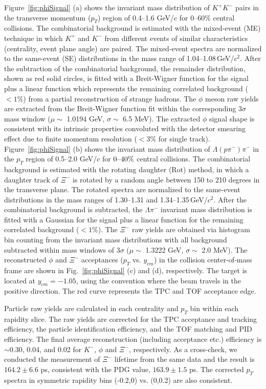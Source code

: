 \documentclass[aps,tightenlines,superscriptaddress,twocolumn]{revtex4-1}
\begin{document}
Figure~\ref{fig:phiSignal} (a) shows the invariant mass distribution of $K^+K^-$ pairs in the transverse momentum ($p_{T}$) region of 0.4--1.6 GeV/$c$ for 0--60\% central collisions. The combinatorial background is estimated with the mixed-event (ME) technique in which $K^+$ and $K^-$ from different events of similar characteristics (centrality, event plane angle) are paired. The mixed-event spectra are normalized to the same-event (SE) distributions in the mass range of 1.04--1.08\,GeV/$c^2$. After the subtraction of the combinatorial background, the remainder distribution, shown as red solid circles, 
is fitted with a Breit-Wigner function for the signal plus a linear function which represents the remaining correlated background ($< 1\%$) from a partial reconstruction of strange hadrons. The $\phi$ meson raw yields are extracted from the Breit-Wigner function fit within the corresponding 3$\sigma$ mass window ($\mu\sim$ 1.0194 GeV, $\sigma\sim$ 6.5 MeV). The extracted $\phi$ signal shape is consistent with its intrinsic properties convoluted with the detector smearing effect due to finite momentum resolution ($<3\%$ for single track).
Figure~\ref{fig:phiSignal} (b) shows the invariant mass distribution of $\Lambda(p\pi^-)\pi^-$ in the $p_{T}$ region of 0.5--2.0 GeV/$c$ for $\textup{0--40\%}$ central collisions. The combinatorial background is estimated with the rotating daughter (Rot) method, in which a daughter track of $\Xi^-$ is rotated by a random angle between 150 to 210 degrees in the transverse plane. The rotated spectra are normalized to the same-event distributions in the mass ranges of 1.30--1.31 and 1.34--1.35\,GeV/$c^2$. After the combinatorial background is subtracted, the $\Lambda\pi^-$ invariant mass distribution is fitted with a Gaussian for the signal plus a linear function for the remaining correlated background ($< 1\%$). The $\Xi^-$ raw yields are obtained via histogram bin counting from the invariant mass distributions with all background subtracted within mass windows of 3$\sigma$ ($\mu\sim$ 1.3222 GeV, $\sigma\sim$ 2.0 MeV). The reconstructed $\phi$ and $\Xi^-$ acceptances ($p_T$ vs. $y_{cm}$) in the collision center-of-mass frame are shown in Fig.~\ref{fig:phiSignal} (c) and (d), respectively.
The target is located at $y_{cm} = -1.05$, using the convention where the beam travels in the positive direction. The red curve represents the TPC and TOF acceptance edge. %

Particle raw yields are calculated in each centrality and $p_{T}$ bin within each rapidity slice. 
The raw yields are corrected for the TPC acceptance and tracking efficiency, %
the particle identification efficiency, %
and the TOF matching and PID efficiency. The final average reconstruction (including acceptance etc.) efficiency is $\sim$0.30, 0.04, and 0.02 for $K^-$, $\phi$ and $\Xi^-$, respectively. As a cross-check, we conducted the measurement of $\Xi^{-}$ lifetime from the same data and the result is $164.2\pm6.6$ ps, consistent with the PDG value, $163.9\pm1.5$ ps. The corrected $p_T$ spectra in symmetric rapidity bins (-0.2,0) vs. (0,0.2) are also consistent.
\end{document}
